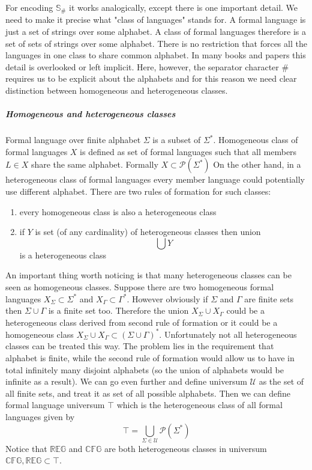 \documentclass[12pt]{article}
\begin{document}
For encoding  $\mathbb{S}_\#$ it works analogically, except there is one important detail. We need to make it precise what "class of languages" stands for. A formal language is just a set of strings over some alphabet. A class of formal languages therefore is a set of sets of strings over some alphabet. There is no restriction that forces all the languages in one class to share common alphabet. In many books and papers this detail is overlooked or left implicit. Here, however, the separator character $\#$ requires us to be explicit about the alphabets and for this reason we need clear distinction between homogeneous and heterogeneous classes. 

 \subparagraph{Homogeneous and heterogeneous classes}  Formal language over finite alphabet $\Sigma$ is a subset of $\Sigma^*$. Homogeneous class of formal languages $X$ is defined as set of formal languages such that all members $L \in X$ share the same alphabet. Formally $X \subset\mathcal{P}(\Sigma^*)$ On the other hand, in a heterogeneous class of formal languages every member language could potentially use different alphabet. There are two rules of formation for such classes:
 \begin{enumerate}
	\item every homogeneous class is also a heterogeneous class
	\item if $Y$ is set (of any cardinality) of  heterogeneous classes then union	\[
	\mathop{\bigcup} Y  
	\] is a heterogeneous class
 \end{enumerate} 
An important thing worth noticing is that many heterogeneous classes can be seen as homogeneous classes. Suppose there are two homogeneous formal languages $X_\Sigma \subset \Sigma^*$ and  $X_\Gamma \subset \Gamma^*$. However obviously if $\Sigma$ and $\Gamma$ are finite sets then $\Sigma \cup \Gamma$ is a finite set too. Therefore the union $X_\Sigma \cup X_\Gamma$ could be a heterogeneous class derived from second rule of formation or it could be a  homogeneous class $X_\Sigma \cup X_\Gamma \subset (\Sigma \cup \Gamma)^*$. Unfortunately not all heterogeneous classes can be treated this way. The problem lies in the requirement that alphabet is finite, while the second rule of formation would allow us to have in total infinitely many disjoint alphabets (so the union of alphabets would be infinite as a result).  We can go even further and define universum $\mathcal{U}$ as the set of all finite sets, and treat it as set of all possible alphabets. Then we can define formal language universum $\top$ which is the heterogeneous class of all formal languages given by \[
\top = \bigcup_{\Sigma \in \mathcal{U}} \mathcal{P}(\Sigma^*) 
\]
Notice that $\mathbb{REG}$ and $\mathbb{CFG}$ are both heterogeneous classes in universum $\mathbb{CFG}, \mathbb{REG} \subset \top$. 
\end{document}
